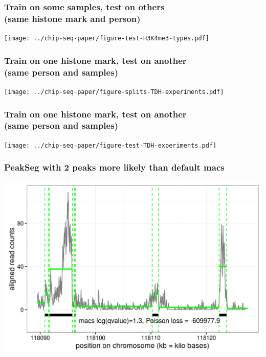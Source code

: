 \documentclass{beamer}
\begin{document}
\begin{frame}
  \frametitle{Train on some samples, test on others\\
(same histone mark and person)}
  \texttt{[image: ../chip-seq-paper/figure-test-H3K4me3-types.pdf]}
\end{frame}

\begin{frame}
  \frametitle{Train on one histone mark, test on another\\
(same person and samples)}
  \texttt{[image: ../chip-seq-paper/figure-splits-TDH-experiments.pdf]}
\end{frame}

\begin{frame}
  \frametitle{Train on one histone mark, test on another\\
(same person and samples)}
  \texttt{[image: ../chip-seq-paper/figure-test-TDH-experiments.pdf]}
\end{frame}


\begin{frame}
  \frametitle{PeakSeg with 2 peaks more likely than default macs}
  \includegraphics[width=1\textwidth]{figure-macs-problem-1-30103.png}
\end{frame}
\end{document}
